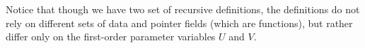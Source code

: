 Notice that though we have two set of recursive definitions, the definitions do not rely on different sets of
data and pointer fields (which are functions), but rather differ only on the first-order parameter variables $U$ 
and $V$. 

%
%
%
